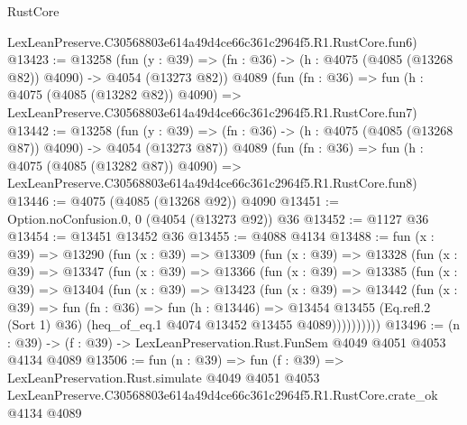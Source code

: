 \begin{lexlean}{RustCore}
\begin{coremodule}
    LexLeanPreserve.C30568803e614a49d4ce66c361c2964f5.R1.RustCore.fun6)
@13423 := @13258
    (fun (y : @39) => (fn : @36) -> (h : @4075 (@4085 (@13268 @82)) @4090) -> @4054 (@13273 @82))
    @4089
    (fun (fn : @36) =>
    fun (h : @4075 (@4085 (@13282 @82)) @4090) =>
    LexLeanPreserve.C30568803e614a49d4ce66c361c2964f5.R1.RustCore.fun7)
@13442 := @13258
    (fun (y : @39) => (fn : @36) -> (h : @4075 (@4085 (@13268 @87)) @4090) -> @4054 (@13273 @87))
    @4089
    (fun (fn : @36) =>
    fun (h : @4075 (@4085 (@13282 @87)) @4090) =>
    LexLeanPreserve.C30568803e614a49d4ce66c361c2964f5.R1.RustCore.fun8)
@13446 := @4075 (@4085 (@13268 @92)) @4090
@13451 := Option.noConfusion.{0, 0} (@4054 (@13273 @92)) @36
@13452 := @1127 @36
@13454 := @13451 @13452 @36
@13455 := @4088 @4134
@13488 := fun (x : @39) =>
  @13290
    (fun (x : @39) =>
    @13309
      (fun (x : @39) =>
      @13328
        (fun (x : @39) =>
        @13347
          (fun (x : @39) =>
          @13366
            (fun (x : @39) =>
            @13385
              (fun (x : @39) =>
              @13404
                (fun (x : @39) =>
                @13423
                  (fun (x : @39) =>
                  @13442
                    (fun (x : @39) =>
                    fun (fn : @36) =>
                    fun (h : @13446) =>
                    @13454
                      @13455
                      (Eq.refl.{2} (Sort 1) @36)
                      (heq_of_eq.{1} @4074 @13452 @13455 @4089))))))))))
@13496 := (n : @39) -> (f : @39) -> LexLeanPreservation.Rust.FunSem @4049 @4051 @4053 @4134 @4089
@13506 := fun (n : @39) =>
  fun (f : @39) =>
  LexLeanPreservation.Rust.simulate
    @4049
    @4051
    @4053
    LexLeanPreserve.C30568803e614a49d4ce66c361c2964f5.R1.RustCore.crate_ok
    @4134
    @4089
\end{coremodule}
\end{lexlean}
